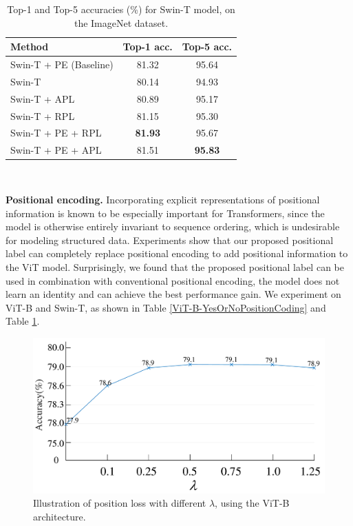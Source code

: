 \documentclass{article}
\begin{document}
\begin{table}[h]
   \centering
   \caption{Top-1 and Top-5 accuracies (\%) for Swin-T model, on the ImageNet dataset.}
   \begin{tabular}{l|c|c}
      \hline %
      Method                   & Top-1 acc.      & Top-5 acc.      \\
      \hline %
      Swin-T + PE (Baseline)      & 81.32     &95.64      \\
      Swin-T            & 80.14    &94.93      \\
      Swin-T + APL   &   80.89  &95.17\\
      Swin-T + RPL   &   81.15  &95.30\\
      Swin-T + PE + RPL   &   \textbf{81.93}  &95.67\\
      Swin-T + PE + APL  & 81.51 & \textbf{95.83}\\
      \hline %
   \end{tabular} \\
   \label{Swin-T-YesOrNoPositionCoding}
\end{table}

\noindent \textbf{Positional encoding.} Incorporating explicit representations of positional information is known to be especially important for Transformers, since the model is otherwise entirely invariant to sequence ordering, which is undesirable for modeling structured data. Experiments show that our proposed positional label can completely replace positional encoding to add positional information to the ViT model. Surprisingly, we found that the proposed positional label can be used in combination with conventional positional encoding, the model does not learn an identity and can achieve the best performance gain. We experiment on ViT-B and Swin-T, as shown in Table \ref{ViT-B-YesOrNoPositionCoding} and Table \ref{Swin-T-YesOrNoPositionCoding}.

\begin{figure}[h]
  \centering
   \includegraphics[width=0.9\linewidth]{Hyperparameter.pdf}
   \caption{Illustration of position loss with different $\lambda$, using the ViT-B architecture.}
   \label{Hyperparameter-flabel}
\end{figure}
\end{document}
